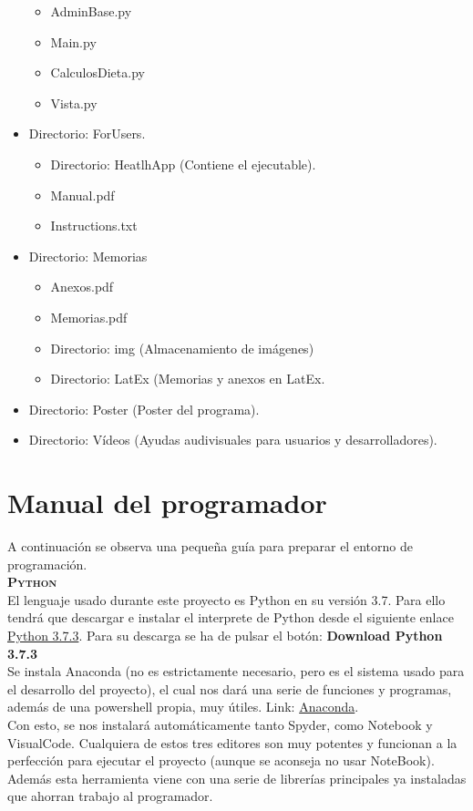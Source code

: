 \begin{itemize}
\begin{itemize}
\item AdminBase.py
\item Main.py
\item CalculosDieta.py
\item Vista.py
\end{itemize}
\item Directorio: ForUsers.
\begin{itemize}
\item Directorio: HeatlhApp (Contiene el ejecutable).
\item Manual.pdf
\item Instructions.txt
\end{itemize}
\item Directorio: Memorias
\begin{itemize}
\item Anexos.pdf
\item Memorias.pdf
\item Directorio: img (Almacenamiento de imágenes)
\item Directorio: LatEx (Memorias y anexos en LatEx.
\end{itemize}
\item Directorio: Poster (Poster del programa).
\item Directorio: Vídeos (Ayudas audivisuales para usuarios y desarrolladores).
\end{itemize}
\section{Manual del programador}
A continuación se observa una pequeña guía para preparar el entorno de programación.\\

\textbf{\textsc{Python}}\\
El lenguaje usado durante este proyecto es Python en su versión 3.7. Para ello tendrá que descargar e instalar el interprete de Python desde el siguiente enlace \href{https://www.python.org/downloads/}{Python 3.7.3}. Para su descarga se ha de pulsar el botón: \textbf{Download Python 3.7.3}\\

Se instala Anaconda (no es estrictamente necesario, pero es el sistema usado para el desarrollo del proyecto), el cual nos dará una serie de funciones y programas, además de una powershell propia, muy útiles. Link: \href{https://www.anaconda.com/distribution/}{Anaconda}.\\
Con esto, se nos instalará automáticamente tanto Spyder, como Notebook y VisualCode. Cualquiera de estos tres editores son muy potentes y funcionan a la perfección para ejecutar el proyecto (aunque se aconseja no usar NoteBook). Además esta herramienta viene con una serie de librerías principales ya instaladas que ahorran trabajo al programador.\\

